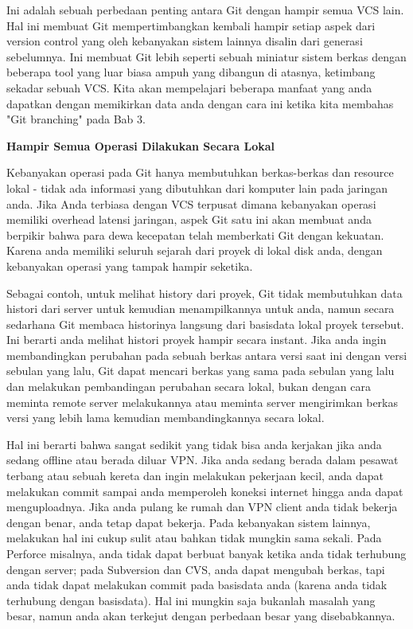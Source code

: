 Ini adalah sebuah perbedaan penting antara Git dengan hampir semua VCS 
lain. Hal ini membuat Git mempertimbangkan kembali hampir setiap aspek 
dari version control yang oleh kebanyakan sistem lainnya disalin dari 
generasi sebelumnya. Ini membuat Git lebih seperti sebuah miniatur 
sistem berkas dengan beberapa tool yang luar biasa ampuh yang dibangun 
di atasnya, ketimbang sekadar sebuah VCS. Kita akan mempelajari beberapa 
manfaat yang anda dapatkan dengan memikirkan data anda dengan cara ini 
ketika kita membahas "Git branching" pada Bab 3.\vspace{12pt}

\textbf{Hampir Semua Operasi Dilakukan Secara Lokal}\vspace{12pt}

Kebanyakan operasi pada Git hanya membutuhkan berkas-berkas dan resource 
lokal - tidak ada informasi yang dibutuhkan dari komputer lain pada 
jaringan anda. Jika Anda terbiasa dengan VCS terpusat dimana kebanyakan 
operasi memiliki overhead latensi jaringan, aspek Git satu ini akan 
membuat anda berpikir bahwa para dewa kecepatan telah memberkati Git 
dengan kekuatan. Karena anda memiliki seluruh sejarah dari proyek di 
lokal disk anda, dengan kebanyakan operasi yang tampak hampir seketika.\vspace{12pt}

Sebagai contoh, untuk melihat history dari proyek, Git tidak membutuhkan 
data histori dari server untuk kemudian menampilkannya untuk anda, namun 
secara sedarhana Git membaca historinya langsung dari basisdata lokal 
proyek tersebut. Ini berarti anda melihat histori proyek hampir secara 
instant. Jika anda ingin membandingkan perubahan pada sebuah berkas 
antara versi saat ini dengan versi sebulan yang lalu, Git dapat mencari 
berkas yang sama pada sebulan yang lalu dan melakukan pembandingan 
perubahan secara lokal, bukan dengan cara meminta remote server 
melakukannya atau meminta server mengirimkan berkas versi yang lebih 
lama kemudian membandingkannya secara lokal.\vspace{12pt}

Hal ini berarti bahwa sangat sedikit yang tidak bisa anda kerjakan jika 
anda sedang offline atau berada diluar VPN. Jika anda sedang berada 
dalam pesawat terbang atau sebuah kereta dan ingin melakukan pekerjaan 
kecil, anda dapat melakukan commit sampai anda memperoleh koneksi 
internet hingga anda dapat menguploadnya. Jika anda pulang ke rumah dan 
VPN client anda tidak bekerja dengan benar, anda tetap dapat bekerja. 
Pada kebanyakan sistem lainnya, melakukan hal ini cukup sulit atau 
bahkan tidak mungkin sama sekali. Pada Perforce misalnya, anda tidak 
dapat berbuat banyak ketika anda tidak terhubung dengan server; pada 
Subversion dan CVS, anda dapat mengubah berkas, tapi anda tidak dapat 
melakukan commit pada basisdata anda (karena anda tidak terhubung dengan 
basisdata). Hal ini mungkin saja bukanlah masalah yang besar, namun anda 
akan terkejut dengan perbedaan besar yang disebabkannya.\vspace{12pt}

